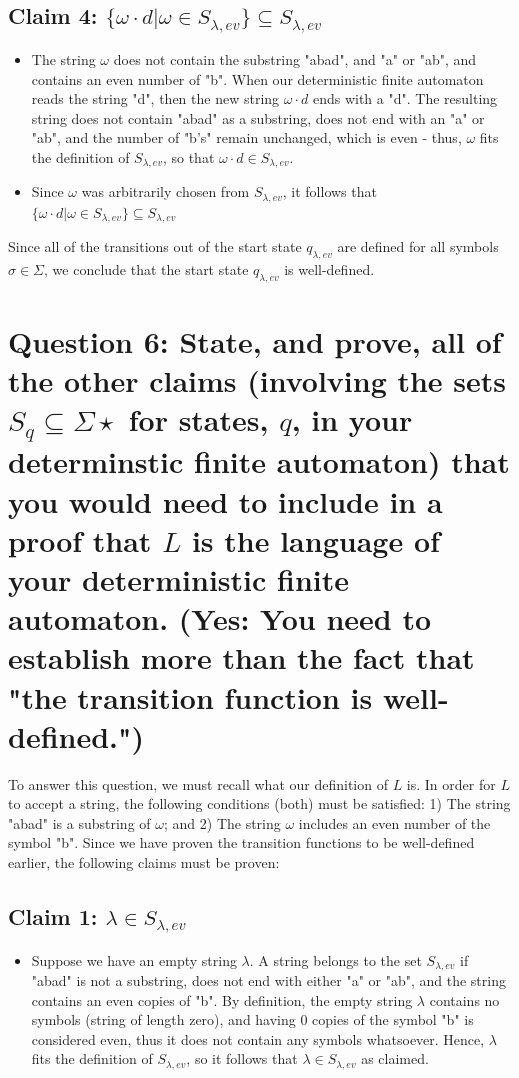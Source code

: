 \documentclass{article}
\begin{document}
\subsection*{Claim 4: $\{\omega\cdot d|\omega\in S_{\lambda,ev}\} \subseteq S_{\lambda,ev}$}
\begin{itemize}
    \item The string $\omega$ does not contain the substring "abad", and "a" or "ab", and contains an even number of "b". When our deterministic finite automaton reads the string "d", then 
    the new string $\omega\cdot d$ ends with a "d". The resulting string does not contain "abad" as a substring, does not end with an "a" or "ab", and the number of "b's" remain unchanged, which is even - 
    thus, $\omega$ fits the definition of $S_{\lambda,ev}$, so that $\omega\cdot d\in S_{\lambda,ev}$. 
    \item Since $\omega$ was arbitrarily chosen from $S_{\lambda,ev}$, it follows that $\{\omega\cdot d|\omega\in S_{\lambda,ev}\}\subseteq S_{\lambda,ev}$ 
\end{itemize}
\noindent
Since all of the transitions out of the start state $q_{\lambda,ev}$ are defined for all symbols $\sigma\in\Sigma$, we conclude that the start state $q_{\lambda,ev}$ is well-defined.
\newpage

\section*{Question 6: State, and prove, all of the other claims (involving the sets $S_q \subseteq \Sigma\star$ for states, $q$, in your determinstic finite automaton)
that you would need to include in a proof that $L$ is the language of your deterministic finite automaton. (Yes: You need to establish more than the fact that 
"the transition function is well-defined.")}

To answer this question, we must recall what our definition of $L$ is. In order for $L$ to accept a string, the following conditions (both) must be satisfied: 1) The 
string "abad" is a substring of $\omega$; and 2) The string $\omega$ includes an even number of the symbol "b". Since we have proven the transition functions to be well-defined
earlier, the following claims must be proven:

\subsection*{Claim 1: $\lambda \in S_{\lambda,ev}$}
\begin{itemize}
    \item Suppose we have an empty string $\lambda$. A string belongs to the set $S_{\lambda,ev}$ if "abad" is not a substring, does not end with either "a" or "ab", and 
    the string contains an even copies of "b". By definition, the empty string $\lambda$ contains no symbols (string of length zero), and having 0 copies of the symbol "b" is 
    considered even, thus it does not contain any symbols whatsoever. Hence, $\lambda$ fits the definition of $S_{\lambda,ev}$, so it follows that $\lambda \in S_{\lambda,ev}$ as claimed.
\end{itemize}
\end{document}
